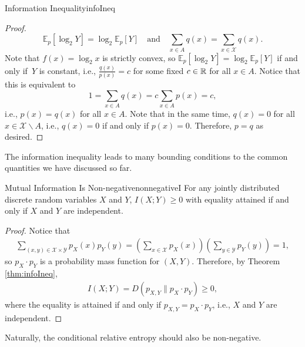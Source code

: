 \documentclass[math]{amznotes}
\theoremstyle{remark}
\begin{document}
\begin{thmbox}{Information Inequality}{infoIneq}
\begin{proof}
        \begin{equation*}
            \mathbb{E}_p\left[\log_2Y\right] = \log_2\mathbb{E}_p\left[Y\right] \quad\textrm{and}\quad \sum_{x \in A}q\left(x\right) = \sum_{x \in \mathcal{X}}q\left(x\right).
        \end{equation*}
        Note that $f\left(x\right) = \log_2x$ is strictly convex, so $\mathbb{E}_p\left[\log_2Y\right] = \log_2\mathbb{E}_p\left[Y\right]$ if and only if~$Y$ is constant, i.e., $\frac{q\left(x\right)}{p\left(x\right)} = c$ for some fixed $c \in \mathbb{R}$ for all $x \in A$. Notice that this is equivalent to 
        \begin{equation*}
            1 = \sum_{x \in A}q\left(x\right) = c\sum_{x \in A}p\left(x\right) = c,
        \end{equation*}
        i.e., $p\left(x\right) = q\left(x\right)$ for all $x \in A$. Note that in the same time, $q\left(x\right) = 0$ for all $x \in \mathcal{X} \backslash A$, i.e., $q\left(x\right) = 0$ if and only if $p\left(x\right) = 0$. Therefore, $p = q$ as desired.
    \end{proof}
\end{thmbox}
The information inequality leads to many bounding conditions to the common quantities we have discussed so far.
\begin{corbox}{Mutual Information Is Non-negative}{nonnegativeI}
    For any jointly distributed discrete random variables $X$ and $Y$, $I\left(X ; Y\right) \geq 0$ with equality attained if and only if $X$ and $Y$ are independent.
    \tcblower
    \begin{proof}
        Notice that 
        \begin{align*}
            \sum_{\left(x, y\right) \in \mathcal{X \times Y}}p_X\left(x\right)p_Y\left(y\right) = \left(\sum_{x \in \mathcal{X}}p_X\left(x\right)\right)\left(\sum_{y \in \mathcal{Y}}p_Y\left(y\right)\right) = 1,
        \end{align*}
        so $p_X \cdot p_Y$ is a probability mass function for $\left(X, Y\right)$. Therefore, by Theorem \ref{thm:infoIneq}, 
        \begin{align*}
            I\left(X ; Y\right) = D\left(p_{X, Y} \parallel p_X \cdot p_Y\right) \geq 0,
        \end{align*}
        where the equality is attained if and only if $p_{X, Y} = p_X \cdot p_Y$, i.e., $X$ and $Y$ are independent.
    \end{proof}
\end{corbox}
Naturally, the conditional relative entropy should also be non-negative.
\end{document}
